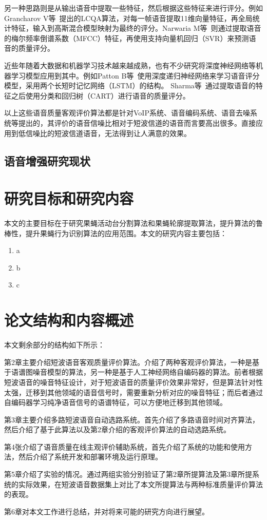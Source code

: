 另一种思路则是从输出语音中提取一些特征，然后根据这些特征来进行评分。例如Grancharov V等~\cite{grancharov2006low}提出的LCQA算法，对每一帧语音提取11维向量特征，再全局统计特征，输入到高斯混合模型映射为最终的评分。Narwaria M等~\cite{narwaria2010non}则通过提取语音的梅尔频率倒谱系数（MFCC）特征，再使用支持向量机回归（SVR）来预测语音的质量评分。

近些年随着大数据和机器学习技术越来越成熟，也有不少研究将深度神经网络等机器学习模型应用到其中。例如Patton B等~\cite{patton2016automos}使用深度递归神经网络来学习语音评分模型，采用两个长短时记忆网络（LSTM）的结构。 Sharma等~\cite{sharma2016data}通过提取语音的特征之后使用分类和回归树（CART）进行语音的质量评分。

以上这些语音质量客观评价算法都是针对VoIP系统、语音编码系统、语音去噪系统等提出的，其评价的语音信噪比相对于短波信道的语音而言要高出很多。直接应用到低信噪比的短波信道语音，无法得到让人满意的效果。

\subsection{语音增强研究现状}

\section{研究目标和研究内容}

本文的主要目标在于研究果蝇活动台分割算法和果蝇轮廓提取算法，提升算法的鲁棒性，提升果蝇行为识别算法的应用范围。本文的研究内容主要包括：
\begin{enumerate}
\item a
\item b
\item c
\end{enumerate}

\section{论文结构和内容概述}

本文剩余部分的结构如下所示：

第2章主要介绍短波语音客观质量评价算法。介绍了两种客观评价算法，一种是基于语谱图噪音模型的算法，另一种是基于人工神经网络自编码器的算法。前者根据短波语音的噪音特征设计，对于短波语音的质量评价效果非常好，但是算法针对性太强，迁移到其他领域的语音信号时，需要重新分析对应的噪音特征；而后者通过自编码器学习纯净语音信号的语谱特征，可以方便地迁移到其他领域。

第3章主要介绍多路短波语音自动选路系统。首先介绍了多路语音时间对齐算法，然后介绍了基于此算法以及第2章介绍的客观评价算法的自动选路系统。

第4张介绍了语音质量在线主观评价辅助系统，首先介绍了系统的功能和使用方法，然后介绍了系统开发和部署环境及运行原理。

第5章介绍了实验的情况。通过两组实验分别验证了第2章所提算法及第3章所提系统的实际效果，在短波语音数据集上对比了本文所提算法与两种标准质量评价算法的表现。

第6章对本文工作进行总结，并对将来可能的研究方向进行展望。

